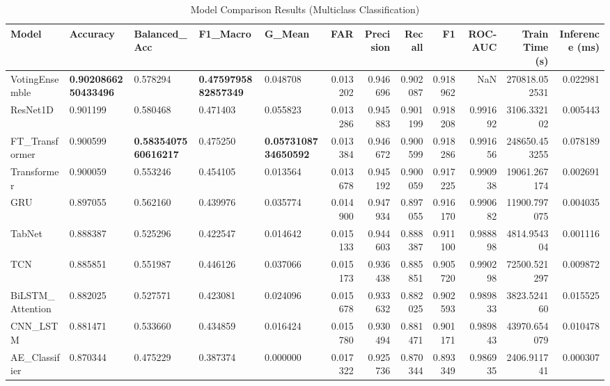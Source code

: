 \begin{table}
\caption{Model Comparison Results (Multiclass Classification)}
\label{tab:model_comparison_multiclass}
\begin{tabular}{lllllrrrrrrr}
\toprule
Model & Accuracy & Balanced_Acc & F1_Macro & G_Mean & FAR & Precision & Recall & F1 & ROC-AUC & Train Time (s) & Inference (ms) \\
\midrule
VotingEnsemble & \textbf{0.9020866250433496} & 0.578294 & \textbf{0.4759795882857349} & 0.048708 & 0.013202 & 0.946696 & 0.902087 & 0.918962 & NaN & 270818.052531 & 0.022981 \\
ResNet1D & 0.901199 & 0.580468 & 0.471403 & 0.055823 & 0.013286 & 0.945883 & 0.901199 & 0.918208 & 0.991692 & 3106.332102 & 0.005443 \\
FT_Transformer & 0.900599 & \textbf{0.5835407560616217} & 0.475250 & \textbf{0.0573108734650592} & 0.013384 & 0.946672 & 0.900599 & 0.918286 & 0.991656 & 248650.453255 & 0.078189 \\
Transformer & 0.900059 & 0.553246 & 0.454105 & 0.013564 & 0.013678 & 0.945192 & 0.900059 & 0.917225 & 0.990938 & 19061.267174 & 0.002691 \\
GRU & 0.897055 & 0.562160 & 0.439976 & 0.035774 & 0.014900 & 0.947934 & 0.897055 & 0.916170 & 0.990682 & 11900.797075 & 0.004035 \\
TabNet & 0.888387 & 0.525296 & 0.422547 & 0.014642 & 0.015133 & 0.944603 & 0.888387 & 0.911100 & 0.988898 & 4814.954304 & 0.001116 \\
TCN & 0.885851 & 0.551987 & 0.446126 & 0.037066 & 0.015173 & 0.936438 & 0.885851 & 0.905720 & 0.990298 & 72500.521297 & 0.009872 \\
BiLSTM_Attention & 0.882025 & 0.527571 & 0.423081 & 0.024096 & 0.015678 & 0.933632 & 0.882025 & 0.902593 & 0.989833 & 3823.524160 & 0.015525 \\
CNN_LSTM & 0.881471 & 0.533660 & 0.434859 & 0.016424 & 0.015780 & 0.930494 & 0.881471 & 0.901171 & 0.989843 & 43970.654079 & 0.010478 \\
AE_Classifier & 0.870344 & 0.475229 & 0.387374 & 0.000000 & 0.017322 & 0.925736 & 0.870344 & 0.893349 & 0.986935 & 2406.911741 & 0.000307 \\
\bottomrule
\end{tabular}
\end{table}
